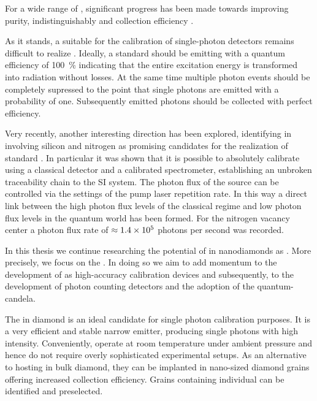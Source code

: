 	For a wide range of \spss, significant progress has been made towards improving purity, indistinguishably and collection efficiency \cite{lee2011planar, chen201199, ates2013improving, PhysRevLett.116.020401, somaschi2016near}.

	As it stands, a \sps suitable for the calibration of single-photon detectors remains difficult to realize \cite{Vaigu2017}. Ideally, a standard \sps should be emitting with a quantum efficiency of \SI{100}{\percent} indicating that the entire excitation energy is transformed into radiation without losses. At the same time multiple photon events should be completely supressed to the point that single photons are emitted with a probability of one. Subsequently emitted photons should be collected with perfect efficiency.

	Very recently, another interesting direction has been explored, identifying \ccs in \nds involving silicon \cite{Neu2012a, Neu2012b} and nitrogen \cite{doherty2013nitrogen} as promising candidates for the realization of standard \spss \cite{Rodiek2017,Vaigu2017}. In particular it was shown that it is possible to absolutely calibrate \spss using a classical detector and a calibrated spectrometer, establishing an unbroken traceability chain to the SI system. The photon flux of the source can be controlled via the settings of the pump laser repetition rate. In this way a direct link between the high photon flux levels of the classical regime and low photon flux levels in the quantum world has been formed. For the nitrogen vacancy center a photon flux rate of $\approx \num{1.4d5}$ photons per second was recorded.

	In this thesis we continue researching the potential of \ccs in nanodiamonds as \spss. More precisely, we focus on the \sivc. In doing so we aim to add momentum to the development of \sps as high-accuracy calibration devices and subsequently, to the development of photon counting detectors and the adoption of the quantum-candela.

	The \siv in diamond is an ideal candidate for single photon calibration purposes. It is a very efficient and stable narrow \lw emitter, producing single photons with high intensity. Conveniently, \sivs operate at room temperature under ambient pressure and hence do not require overly sophisticated experimental setups. As an alternative to hosting \sivs in bulk diamond, they can be implanted in nano-sized diamond grains offering increased collection efficiency. Grains containing individual \sivs can be identified and preselected.

